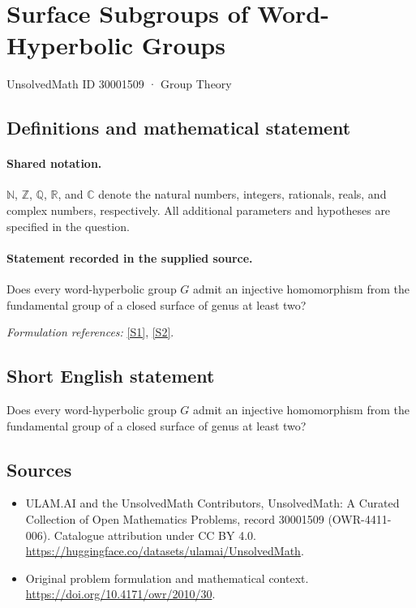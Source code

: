 \documentclass[11pt]{article}
\newcommand{\sref}[2]{\hyperlink{source:#1:#2}{[S#2]}}
\begin{document}
\setcounter{section}{30001508}
\section{Surface Subgroups of Word-Hyperbolic Groups}\label{30001509}
{\small UnsolvedMath ID 30001509 · Group Theory}
\subsection{Definitions and mathematical statement}

\paragraph{Shared notation.}$\mathbb N$, $\mathbb Z$, $\mathbb Q$, $\mathbb R$, and $\mathbb C$ denote the natural numbers, integers, rationals, reals, and complex numbers, respectively. All additional parameters and hypotheses are specified in the question.


\paragraph{Statement recorded in the supplied source.}
Does every word-hyperbolic group $G$ admit an injective homomorphism from the fundamental group of a closed surface of genus at least two?
\par\smallskip\textit{Formulation references:} \sref{30001509}{1}, \sref{30001509}{2}.
\subsection{Short English statement}
Does every word-hyperbolic group $G$ admit an injective homomorphism from the fundamental group of a closed surface of genus at least two?
\subsection{Sources}
\begin{itemize}
\item[\hypertarget{source:30001509:1}{S1}] ULAM.AI and the UnsolvedMath Contributors, UnsolvedMath: A Curated Collection of Open Mathematics Problems, record 30001509 (OWR-4411-006). Catalogue attribution under CC BY 4.0.
\url{https://huggingface.co/datasets/ulamai/UnsolvedMath}.
\item[\hypertarget{source:30001509:2}{S2}] Original problem formulation and mathematical context.
\url{https://doi.org/10.4171/owr/2010/30}.
\end{itemize}
\label{end:30001509}
\end{document}
